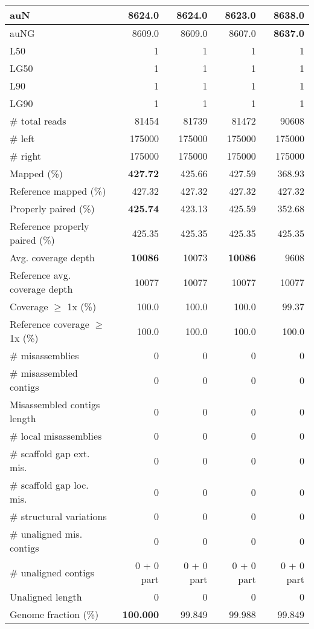 \documentclass[12pt,a4paper]{article}
\begin{document}
\begin{table}[ht]
\begin{center}
\begin{tabular}{|l*{4}{|r}|}
auN & 8624.0 & 8624.0 & 8623.0 & {\bf 8638.0} \\ \hline
auNG & 8609.0 & 8609.0 & 8607.0 & {\bf 8637.0} \\ \hline
L50 & 1 & 1 & 1 & 1 \\ \hline
LG50 & 1 & 1 & 1 & 1 \\ \hline
L90 & 1 & 1 & 1 & 1 \\ \hline
LG90 & 1 & 1 & 1 & 1 \\ \hline
\# total reads & 81454 & 81739 & 81472 & 90608 \\ \hline
\# left & 175000 & 175000 & 175000 & 175000 \\ \hline
\# right & 175000 & 175000 & 175000 & 175000 \\ \hline
Mapped (\%) & {\bf 427.72} & 425.66 & 427.59 & 368.93 \\ \hline
Reference mapped (\%) & 427.32 & 427.32 & 427.32 & 427.32 \\ \hline
Properly paired (\%) & {\bf 425.74} & 423.13 & 425.59 & 352.68 \\ \hline
Reference properly paired (\%) & 425.35 & 425.35 & 425.35 & 425.35 \\ \hline
Avg. coverage depth & {\bf 10086} & 10073 & {\bf 10086} & 9608 \\ \hline
Reference avg. coverage depth & 10077 & 10077 & 10077 & 10077 \\ \hline
Coverage $\geq$ 1x (\%) & 100.0 & 100.0 & 100.0 & 99.37 \\ \hline
Reference coverage $\geq$ 1x (\%) & 100.0 & 100.0 & 100.0 & 100.0 \\ \hline
\# misassemblies & 0 & 0 & 0 & 0 \\ \hline
\# misassembled contigs & 0 & 0 & 0 & 0 \\ \hline
Misassembled contigs length & 0 & 0 & 0 & 0 \\ \hline
\# local misassemblies & 0 & 0 & 0 & 0 \\ \hline
\# scaffold gap ext. mis. & 0 & 0 & 0 & 0 \\ \hline
\# scaffold gap loc. mis. & 0 & 0 & 0 & 0 \\ \hline
\# structural variations & 0 & 0 & 0 & 0 \\ \hline
\# unaligned mis. contigs & 0 & 0 & 0 & 0 \\ \hline
\# unaligned contigs & 0 + 0 part & 0 + 0 part & 0 + 0 part & 0 + 0 part \\ \hline
Unaligned length & 0 & 0 & 0 & 0 \\ \hline
Genome fraction (\%) & {\bf 100.000} & 99.849 & 99.988 & 99.849 \\ \hline

\end{tabular}
\end{center}
\end{table}
\end{document}
